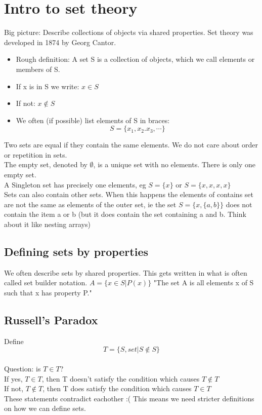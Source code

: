 \documentclass[a4paper, 11pt]{report}
\begin{document}
    \section{Intro to set theory}
    Big picture: Describe collections of objects via shared properties. Set theory was developed in 1874 by Georg Cantor.\\
    \begin{itemize}
	\item Rough definition: A set S is a collection of objects, which we call elements or members of S.
	\item If x is in S we write: \(x \in S\)
	\item If not: \(x \notin S\)
	\item We often (if possible) list elements of S in braces: \[S = \{x_{1}, x_{2}. x_{3}, \cdots \}\]
    \end{itemize}
    Two sets are equal if they contain the same elements. We do not care about order or repetition in sets. \\
    The empty set, denoted by \(\emptyset\), is a unique set with no elements. There is only one empty set. \\
    A Singleton set has precisely one elements, eg \(S = \{x\}\) or \(S = \{x, x, x, x\}\) \\
    Sets can also contain other sets. When this happens the elements of contains set are not the same as elements of the outer set, ie the set \(S = \{x, \{a, b\}\}\) does not contain the item a or b (but it does contain the set containing a and b. Think about it like nesting arrays) \\
	\subsection{Defining sets by properties}
	We often describe sets by shared properties. This gets written in what is often called set builder notation. \(A = \{x \in S | P(x)\}\) "The set A is all elements x of S such that x has property P."\\
	\subsection{Russell's Paradox}
	Define \[T = \{S, set | S \notin S\}\] \\
	Question: is \(T \in T\)?\\
	If yes, \(T \in T\), then T doesn't satisfy the condition which causes \(T \notin T\)\\
	If not, \(T \notin T\), then T does satisfy the condition which causes \(T \in T\) \\
	These statements contradict eachother :( This means we need stricter definitions on how we can define sets.\\
\end{document}
